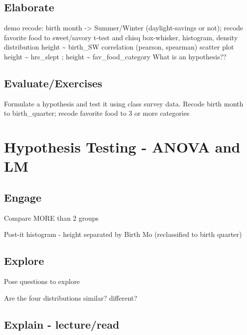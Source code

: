 \documentclass[
]{book}
\begin{document}
\hypertarget{elaborate-3}{%
\section{Elaborate}\label{elaborate-3}}

demo recode: birth month -\textgreater{} Summer/Winter (daylight-savings or not); recode favorite food to sweet/savory
t-test and chisq \textbar{} box-whisker, histogram, density distribution
height \textasciitilde{} birth\_SW
correlation (pearson, spearman) \textbar{} scatter plot
height \textasciitilde{} hrs\_slept ; height \textasciitilde{} fav\_food\_category
What is an hypothesis??

\hypertarget{evaluateexercises-3}{%
\section{Evaluate/Exercises}\label{evaluateexercises-3}}

Formulate a hypothesis and test it using class survey data.
Recode birth month to birth\_quarter; recode favorite food to 3 or more categories

\hypertarget{hypothesis-testing---anova-and-lm}{%
\chapter{Hypothesis Testing - ANOVA and LM}\label{hypothesis-testing---anova-and-lm}}

\hypertarget{engage-4}{%
\section{Engage}\label{engage-4}}

Compare MORE than 2 groups

Post-it histogram - height separated by Birth Mo (reclassified to birth quarter)

\hypertarget{explore-4}{%
\section{Explore}\label{explore-4}}

Pose questions to explore

Are the four distributions similar? different?

\hypertarget{explain---lectureread-2}{%
\section{Explain - lecture/read}\label{explain---lectureread-2}}
\end{document}
